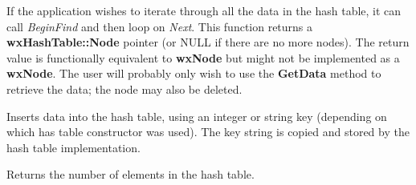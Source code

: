 

If the application wishes to iterate through all the data in the hash
table, it can call {\it BeginFind} and then loop on {\it Next}. This function
returns a {\bf wxHashTable::Node} pointer (or NULL if there are no more nodes).
The return value is functionally equivalent to \textbf{wxNode} but might not be
implemented as a \textbf{wxNode}. The user will probably only wish to use the
\textbf{GetData} method to retrieve the data; the node may also be deleted.




Inserts data into the hash table, using an integer or string key (depending on which
has table constructor was used). The key string is copied and stored by the hash
table implementation.



Returns the number of elements in the hash table.

